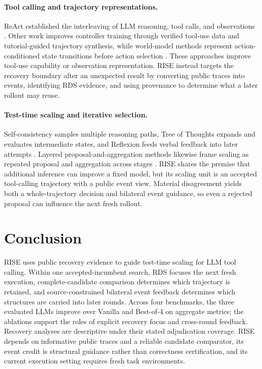 \documentclass{article}
\begin{document}
\paragraph{Tool calling and trajectory representations.} ReAct established the interleaving of LLM reasoning, tool calls, and observations \citep{yao2023react}. Other work improves controller training through verified tool-use data and tutorial-guided trajectory synthesis, while world-model methods represent action-conditioned state transitions before action selection \citep{mat2025,agenttrek2025,wma2025}. These approaches improve tool-use capability or observation representation. RISE instead targets the recovery boundary after an unexpected result by converting public traces into events, identifying RDS evidence, and using provenance to determine what a later rollout may reuse.

\paragraph{Test-time scaling and iterative selection.} Self-consistency samples multiple reasoning paths, Tree of Thoughts expands and evaluates intermediate states, and Reflexion feeds verbal feedback into later attempts \citep{wang2023selfconsistency,yao2023tree,shinn2023reflexion}. Layered proposal-and-aggregation methods likewise frame scaling as repeated proposal and aggregation across stages \citep{moa2024}. RISE shares the premise that additional inference can improve a fixed model, but its scaling unit is an accepted tool-calling trajectory with a public event view. Material disagreement yields both a whole-trajectory decision and bilateral event guidance, so even a rejected proposal can influence the next fresh rollout.

\section{Conclusion}

RISE uses public recovery evidence to guide test-time scaling for LLM tool calling. Within one accepted-incumbent search, RDS focuses the next fresh execution, complete-candidate comparison determines which trajectory is retained, and source-constrained bilateral event feedback determines which structures are carried into later rounds. Across four benchmarks, the three evaluated LLMs improve over Vanilla and Best-of-4 on aggregate metrics; the ablations support the roles of explicit recovery focus and cross-round feedback. Recovery analyses are descriptive under their stated adjudication coverage. RISE depends on informative public traces and a reliable candidate comparator, its event credit is structural guidance rather than correctness certification, and its current execution setting requires fresh task environments.
\end{document}
